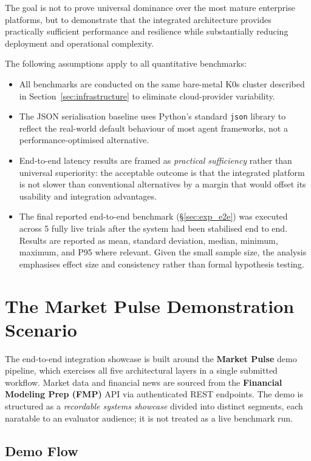 \documentclass[12pt, a4paper]{report}
\begin{document}
The goal is not to prove universal dominance over the most mature enterprise platforms,
but to demonstrate that the integrated architecture provides practically sufficient
performance and resilience while substantially reducing deployment and operational
complexity.

The following assumptions apply to all quantitative benchmarks:

\begin{itemize}
  \item All benchmarks are conducted on the same bare-metal K0s cluster described in
  Section~\ref{sec:infrastructure} to eliminate cloud-provider variability.
  \item The JSON serialisation baseline uses Python's standard \texttt{json} library
  to reflect the real-world default behaviour of most agent frameworks, not a
  performance-optimised alternative.
  \item End-to-end latency results are framed as \emph{practical sufficiency} rather
  than universal superiority: the acceptable outcome is that the integrated platform
  is not slower than conventional alternatives by a margin that would offset its
  usability and integration advantages.
  \item The final reported end-to-end benchmark (\S\ref{sec:exp_e2e}) was executed
  across 5 fully live trials after the system had been stabilised end to end.
  Results are reported as mean, standard deviation, median, minimum, maximum,
  and P95 where relevant. Given the small sample size, the analysis emphasises
  effect size and consistency rather than formal hypothesis testing.
\end{itemize}

\section{The Market Pulse Demonstration Scenario}
\label{sec:market_pulse}

The end-to-end integration showcase is built around the \textbf{Market Pulse} demo
pipeline, which exercises all five architectural layers in a single submitted workflow.
Market data and financial news are sourced from the \textbf{Financial Modeling Prep
(FMP)} API via authenticated REST endpoints. The demo is structured as a
\emph{recordable systems showcase} divided into distinct segments, each naratable
to an evaluator audience; it is not treated as a live benchmark run.

\subsection{Demo Flow}
\label{ssec:demo_flow}
\end{document}
